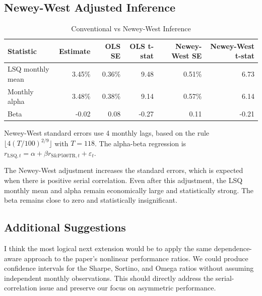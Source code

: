 \documentclass[11pt]{article}
\begin{document}
\subsection*{Newey-West Adjusted Inference}
\begin{table}[H]
\centering
\caption{Conventional vs Newey-West Inference}
\label{tab:newey-west}
\small
\begin{tabular}{lrrrrr}
\toprule
Statistic & Estimate & OLS SE & OLS t-stat & Newey-West SE & Newey-West t-stat \\
\midrule
LSQ monthly mean & 3.45\% & 0.36\% & 9.48 & 0.51\% & 6.73 \\
Monthly alpha & 3.48\% & 0.38\% & 9.14 & 0.57\% & 6.14 \\
Beta & -0.02 & 0.08 & -0.27 & 0.11 & -0.21 \\
\bottomrule
\end{tabular}

\vspace{0.15cm}
\begin{minipage}{0.92\linewidth}
\footnotesize
Newey-West standard errors use 4 monthly lags, based on the rule $\lfloor 4(T/100)^{2/9}\rfloor$ with $T=118$.
The alpha-beta regression is $r_{\mathrm{LSQ},t}=\alpha+\beta r_{\mathrm{S\&P500TR},t}+\varepsilon_t$.
\end{minipage}
\end{table}

The Newey-West adjustment increases the standard errors, which is expected when there is positive serial correlation.
Even after this adjustment, the LSQ monthly mean and alpha remain economically large and statistically strong.
The beta remains close to zero and statistically insignificant.

\subsection*{Additional Suggestions}
I think the most logical next extension would be to apply the same dependence-aware approach to the paper's nonlinear performance ratios.
We could produce confidence intervals for the Sharpe, Sortino, and Omega ratios without assuming independent monthly observations.
This should directly address the serial-correlation issue and preserve our focus on asymmetric performance.
\end{document}
